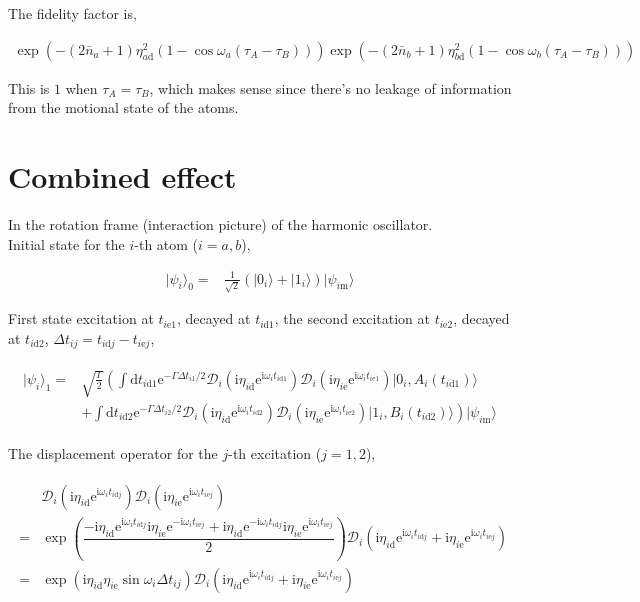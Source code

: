 \documentclass[10pt,fleqn]{article}
\newcommand{\ud}{\mathrm{d}}
\newcommand{\ue}{\mathrm{e}}
\newcommand{\ui}{\mathrm{i}}
\newcommand{\eqar}[1]
{
  \begin{align}
    #1
  \end{align}
}
\newcommand{\paren}[1]{{\left({#1}\right)}}
\newcommand{\lparen}[1]{{\left({#1}\right.}}
\newcommand{\rparen}[1]{{\left.{#1}\right)}}
\begin{document}
The fidelity factor is,
\eqar{
  \exp\paren{
    -\paren{2{\bar n_a}+1}\eta_{a\mathrm{d}}^2\paren{1-\cos\omega_a\paren{\tau_{A}-\tau_{B}}}
  }
  \exp\paren{
    -\paren{2{\bar n_b}+1}\eta_{b\mathrm{d}}^2\paren{1-\cos\omega_b\paren{\tau_{A}-\tau_{B}}}
  }
}
This is $1$ when $\tau_A=\tau_B$, which makes sense since there's no leakage of
information from the motional state of the atoms.

\section{Combined effect}

In the rotation frame (interaction picture) of the harmonic oscillator.\\

Initial state for the $i$-th atom ($i=a,b$),
\eqar{
  |\psi_i\rangle_0=&\frac{1}{\sqrt2}\paren{|0_i\rangle+|1_i\rangle}|\psi_{i\mathrm{m}}\rangle
}
First state excitation at $t_{i\mathrm{e}1}$, decayed at $t_{i\mathrm{d}1}$,
the second excitation at $t_{i\mathrm{e}2}$, decayed at $t_{i\mathrm{d}2}$,
$\Delta t_{ij}=t_{i\mathrm{d}j}-t_{i\mathrm{e}j}$,
\eqar{
  \begin{split}
    |\psi_i\rangle_1=&\sqrt{\frac{\Gamma}{2}}\lparen{\int\ud t_{i\mathrm{d}1}\ue^{-\Gamma\Delta t_{i1}/2}\mathcal{D}_i(\ui\eta_{i\mathrm{d}}\ue^{\ui\omega_it_{i\mathrm{d}1}})\mathcal{D}_i(\ui\eta_{i\mathrm{e}}\ue^{\ui\omega_it_{i\mathrm{e}1}})|0_i,A_i(t_{i\mathrm{d}1})\rangle}\\
                     &\rparen{+\int\ud t_{i\mathrm{d}2}\ue^{-\Gamma\Delta t_{i2}/2}\mathcal{D}_i(\ui\eta_{i\mathrm{d}}\ue^{\ui\omega_it_{i\mathrm{d}2}})\mathcal{D}_i(\ui\eta_{i\mathrm{e}}\ue^{\ui\omega_it_{i\mathrm{e}2}})|1_i,B_i(t_{i\mathrm{d}2})\rangle}|\psi_{i\mathrm{m}}\rangle
  \end{split}
}

The displacement operator for the $j$-th excitation ($j=1,2$),
\eqar{
  \begin{split}
    &\mathcal{D}_i(\ui\eta_{i\mathrm{d}}\ue^{\ui\omega_it_{i\mathrm{d}j}})\mathcal{D}_i(\ui\eta_{i\mathrm{e}}\ue^{\ui\omega_it_{i\mathrm{e}j}})\\
    =&
       \exp\paren{
       \dfrac{-\ui\eta_{i\mathrm{d}}\ue^{\ui\omega_it_{i\mathrm{d}j}}
       \ui\eta_{i\mathrm{e}}\ue^{-\ui\omega_it_{i\mathrm{e}j}}
       +\ui\eta_{i\mathrm{d}}\ue^{-\ui\omega_it_{i\mathrm{d}j}}
       \ui\eta_{i\mathrm{e}}\ue^{\ui\omega_it_{i\mathrm{e}j}}}{2}
       }
       \mathcal{D}_i(\ui\eta_{i\mathrm{d}}\ue^{\ui\omega_it_{i\mathrm{d}j}}+\ui\eta_{i\mathrm{e}}\ue^{\ui\omega_it_{i\mathrm{e}j}})\\
    =&\exp\paren{
       \ui\eta_{i\mathrm{d}}\eta_{i\mathrm{e}}\sin\omega_i\Delta t_{ij}}
       \mathcal{D}_i(\ui\eta_{i\mathrm{d}}\ue^{\ui\omega_it_{i\mathrm{d}j}}+\ui\eta_{i\mathrm{e}}\ue^{\ui\omega_it_{i\mathrm{e}j}})
  \end{split}
}
\end{document}
